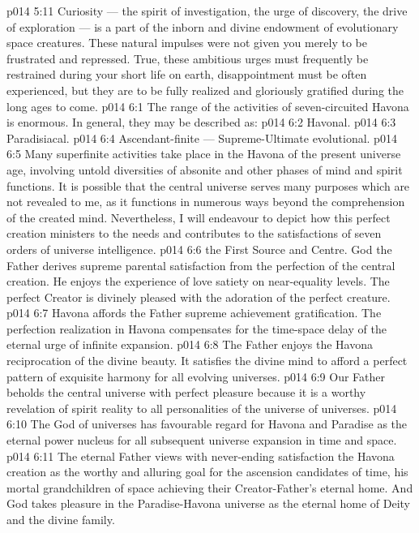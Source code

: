 \vs p014 5:11 Curiosity --- the spirit of investigation, the urge of discovery, the drive of exploration --- is a part of the inborn and divine endowment of evolutionary space creatures. These natural impulses were not given you merely to be frustrated and repressed. True, these ambitious urges must frequently be restrained during your short life on earth, disappointment must be often experienced, but they are to be fully realized and gloriously gratified during the long ages to come.
\vs p014 6:1 The range of the activities of seven\hyp{}circuited Havona is enormous. In general, they may be described as:
\vs p014 6:2 \bibnobreakspace Havonal.
\vs p014 6:3 \bibnobreakspace Paradisiacal.
\vs p014 6:4 \bibnobreakspace Ascendant\hyp{}finite --- Supreme\hyp{}Ultimate evolutional.
\vs p014 6:5 \pc Many superfinite activities take place in the Havona of the present universe age, involving untold diversities of absonite and other phases of mind and spirit functions. It is possible that the central universe serves many purposes which are not revealed to me, as it functions in numerous ways beyond the comprehension of the created mind. Nevertheless, I will endeavour to depict how this perfect creation ministers to the needs and contributes to the satisfactions of seven orders of universe intelligence.
\vs p014 6:6 \bibnobreakspace {} the First Source and Centre. God the Father derives supreme parental satisfaction from the perfection of the central creation. He enjoys the experience of love satiety on near\hyp{}equality levels. The perfect Creator is divinely pleased with the adoration of the perfect creature.
\vs p014 6:7 Havona affords the Father supreme achievement gratification. The perfection realization in Havona compensates for the time\hyp{}space delay of the eternal urge of infinite expansion.
\vs p014 6:8 The Father enjoys the Havona reciprocation of the divine beauty. It satisfies the divine mind to afford a perfect pattern of exquisite harmony for all evolving universes.
\vs p014 6:9 Our Father beholds the central universe with perfect pleasure because it is a worthy revelation of spirit reality to all personalities of the universe of universes.
\vs p014 6:10 The God of universes has favourable regard for Havona and Paradise as the eternal power nucleus for all subsequent universe expansion in time and space.
\vs p014 6:11 The eternal Father views with never\hyp{}ending satisfaction the Havona creation as the worthy and alluring goal for the ascension candidates of time, his mortal grandchildren of space achieving their Creator\hyp{}Father’s eternal home. And God takes pleasure in the Paradise\hyp{}Havona universe as the eternal home of Deity and the divine family.
